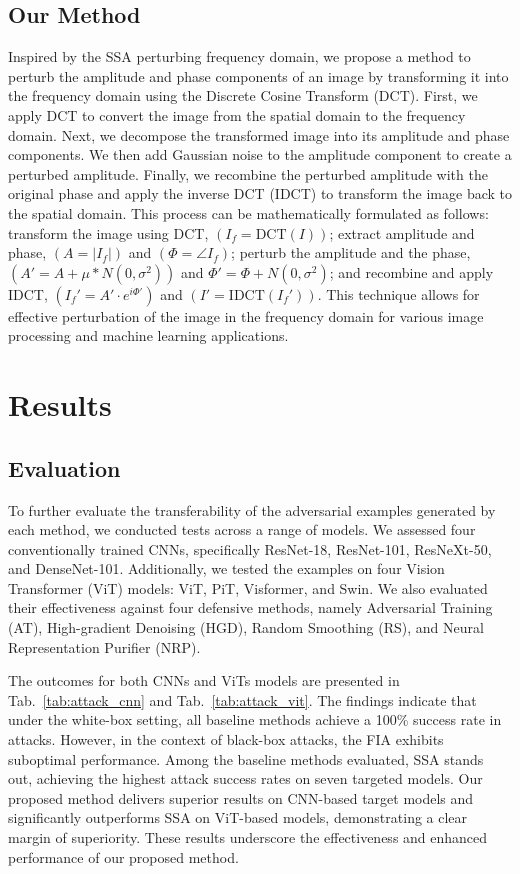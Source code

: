 \subsection{Our Method}
Inspired by the SSA perturbing frequency domain, we propose a method to perturb the amplitude and phase components of an image by transforming it into the frequency domain using the Discrete Cosine Transform (DCT). First, we apply DCT to convert the image from the spatial domain to the frequency domain. Next, we decompose the transformed image into its amplitude and phase components. We then add Gaussian noise to the amplitude component to create a perturbed amplitude. Finally, we recombine the perturbed amplitude with the original phase and apply the inverse DCT (IDCT) to transform the image back to the spatial domain. This process can be mathematically formulated as follows: transform the image using DCT, $( I_f = \text{DCT}(I) )$; extract amplitude and phase, $( A = |I_f| )$ and $( \Phi = \angle I_f )$; perturb the amplitude and the phase, $( A' = A + \mu * N(0, \sigma^2) )$ and $\Phi'=\Phi + N(0, \sigma^2)$; and recombine and apply IDCT, $( I_f' = A' \cdot e^{i\Phi'} )$ and $( I' = \text{IDCT}(I_f') )$. This technique allows for effective perturbation of the image in the frequency domain for various image processing and machine learning applications.

\section{Results}

\subsection{Evaluation}
To further evaluate the transferability of the adversarial examples generated by each method, we conducted tests across a range of models. We assessed four conventionally trained CNNs, specifically ResNet-18, ResNet-101, ResNeXt-50, and DenseNet-101. Additionally, we tested the examples on four Vision Transformer (ViT) models: ViT, PiT, Visformer, and Swin. We also evaluated their effectiveness against four defensive methods, namely Adversarial Training (AT), High-gradient Denoising (HGD), Random Smoothing (RS), and Neural Representation Purifier (NRP).

The outcomes for both CNNs and ViTs models are presented in Tab.~\ref{tab:attack_cnn} and Tab.~\ref{tab:attack_vit}. The findings indicate that under the white-box setting, all baseline methods achieve a 100\% success rate in attacks. However, in the context of black-box attacks, the FIA exhibits suboptimal performance. Among the baseline methods evaluated, SSA stands out, achieving the highest attack success rates on seven targeted models. Our proposed method delivers superior results on CNN-based target models and significantly outperforms SSA on ViT-based models, demonstrating a clear margin of superiority. These results underscore the effectiveness and enhanced performance of our proposed method.

